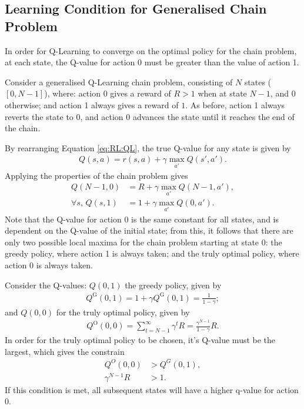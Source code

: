 \subsection{Learning Condition for Generalised Chain Problem}

In order for Q-Learning to converge on the optimal policy for the chain problem,
at each state, the Q-value for action 0 must be greater than the value of action
1.

Consider a generalised Q-Learning chain problem, consisting of $N$ states
($[0,N-1]$), where:
action 0 gives a reward of $R > 1$ when at state $N-1$, and $0$ otherwise;
and action 1 always gives a reward of $1$.
As before, action 1 always reverts the state to 0, and action 0 advances the
state until it reaches the end of the chain.

By rearranging Equation \ref{eq:RL:QL}, the true Q-value for any state is given
by
\begin{align*}
    Q(s,a) = r(s,a) + \gamma\max_{a'}Q(s',a').
\end{align*}
Applying the properties of the chain problem gives
\begin{align*}
    Q(N-1,0) &= R + \gamma\max_{a'}Q(N-1,a'),\\
    \forall s,\, Q(s,1) &= 1 + \gamma\max_{a'}Q(0,a').
\end{align*}
Note that the Q-value for action 0 is the same constant for all states, and is
dependent on the Q-value of the initial state; from this, it follows that there
are only two possible local maxima for the chain problem starting at state 0:
the greedy policy, where action 1 is always taken;
and the truly optimal policy, where action 0 is always taken.

Consider the Q-values: $Q(0,1)$ the greedy policy, given by
\begin{align*}
    Q^\text{G}(0,1) = 1 + \gamma Q^\text{G}(0,1) = \frac{1}{1 - \gamma};
\end{align*}
and $Q(0,0)$ for the truly optimal policy, given by
\begin{align*}
    Q^\text{O}(0,0) = \sum_{t=N-1}^{\infty} \gamma^tR
    = \frac{\gamma^{N-1}}{1 - \gamma}R.
\end{align*}
In order for the truly optimal policy to be chosen, it's Q-value must be the
largest, which gives the constrain
\begin{align*}
    Q^O(0,0) &> Q^G(0,1),\\
    \gamma^{N-1}R &> 1.
\end{align*}
If this condition is met, all subsequent states will have a higher q-value for
action 0.

